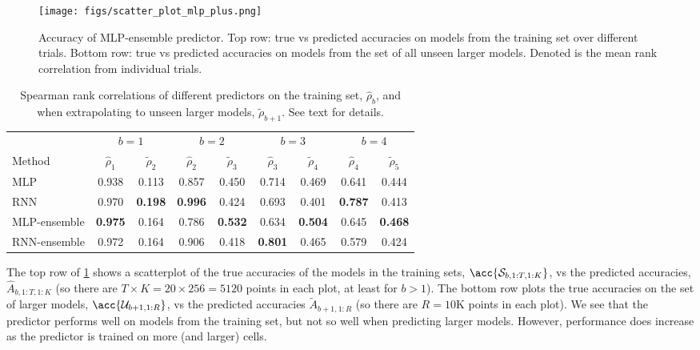 \documentclass[runningheads]{llncs}
\begin{document}
\begin{figure}[t]
\centering
\texttt{[image: figs/scatter\_plot\_mlp\_plus.png]}
\caption{Accuracy of MLP-ensemble predictor.
Top row: true vs predicted accuracies on models from the training set over different trials.
Bottom row:  true vs predicted accuracies on models from the set of all unseen larger models. Denoted is the mean rank correlation from individual trials.
}
\label{fig:MLP}
\end{figure}\begin{table}[t]
\begin{center}
\begin{tabular}{l|cc|cc|cc|cc|}
\toprule
&
\multicolumn{2}{|c|}{$b=1$}
&
\multicolumn{2}{|c|}{$b=2$}
&
\multicolumn{2}{|c|}{$b=3$}
&
\multicolumn{2}{|c|}{$b=4$}
\\
Method
& $\hat{\rho}_1$ & $\tilde{\rho}_2$
& $\hat{\rho}_2$ & $\tilde{\rho}_3$
& $\hat{\rho}_3$ & $\tilde{\rho}_4$
& $\hat{\rho}_4$ & $\tilde{\rho}_5$
\\
\midrule
MLP & 0.938 & 0.113 & 0.857 & 0.450 & 0.714 & 0.469 & 0.641 & 0.444 \\
RNN & 0.970 & {\bf 0.198} & {\bf 0.996} & 0.424 & 0.693 & 0.401 & {\bf 0.787} & 0.413 \\
MLP-ensemble & 
{\bf 0.975} & 0.164 & 0.786 & {\bf 0.532} & 0.634 & {\bf 0.504} & 0.645 & {\bf 0.468} \\
RNN-ensemble &
0.972 & 0.164 & 0.906 & 0.418 & {\bf 0.801} & 0.465 & 0.579 & 0.424 \\
\bottomrule
\end{tabular}
\end{center}
\caption{Spearman rank correlations of different predictors
on the training set, $\hat{\rho}_b$,
and when extrapolating to unseen larger models,
$\tilde{\rho}_{b+1}$.
See text for details.
}
\label{tab:spearman}
\end{table}

The top row of \cref{fig:MLP} shows a scatterplot of
the true accuracies of the models in the training sets, $\acc{\mathcal{S}_{b,1:T,1:K}}$,
vs the predicted accuracies,
$\hat{A}_{b,1:T,1:K}$ (so there are $T \times K = 20 \times 256  = 5120$ points in each plot,
at least for $b>1$).
The bottom row plots 
the true accuracies on the set of larger models,
$\acc{\mathcal{U}_{b+1,1:R}}$,
vs the predicted accuracies
$\tilde{A}_{b+1,1:R}$ (so there are $R=10$K points in each plot).
We see that the predictor performs well on models from the training set,
but not so well when predicting larger models.
However, performance does increase as the predictor is trained on 
more (and larger) cells.
\end{document}
